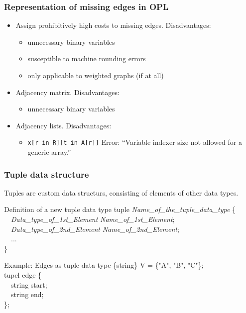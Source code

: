 \begin{frame}
 \frametitle{Representation of missing edges in OPL}
 \begin{itemize}
  \item Assign prohibitively high costs to missing edges. Disadvantages:
  \begin{itemize}
   \item unnecessary binary variables
   \item susceptible to machine rounding errors
   \item only applicable to weighted graphs (if at all)
  \end{itemize}
  \item Adjacency matrix. Disadvantages:
  \begin{itemize}
   \item unnecessary binary variables
  \end{itemize}
  \item Adjacency lists. Disadvantages:
  \begin{itemize}
   \item \texttt{x[r in R][t in A[r]]} \textrightarrow{} Error:
    "`Variable indexer size not allowed for a generic array."'
  \end{itemize}
 \end{itemize}
\end{frame}

\begin{frame}
 \frametitle{Tuple data structure}
 Tuples are custom data structurs, consisting of elements of other data types.
 
 \begin{block}{Definition of a new tuple data type}
 \small\ttfamily
  tuple \textit{Name\_of\_the\_tuple\_data\_type} \{\\
  \ \ \textit{Data\_type\_of\_1st\_Element} \textit{Name\_of\_1st\_Element};\\
  \ \ \textit{Data\_type\_of\_2nd\_Element} \textit{Name\_of\_2nd\_Element};\\
  \ \ ...\\
  \}
  \end{block}
  
  \begin{block}{Example: Edges as tuple data type}
   \ttfamily\small
   \{string\} V = \{"A", "B", "C"\};\\
   tupel edge \{\\
   \ \ string start;\\
   \ \ string end;\\
  \};
  \end{block}
\end{frame}

